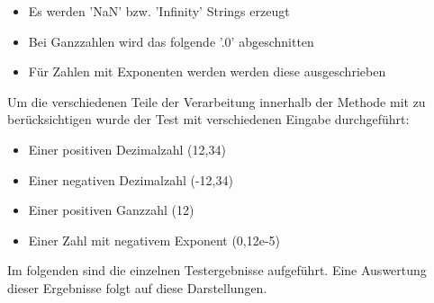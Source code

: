 \begin{itemize}
 	\item Es werden 'NaN' bzw. 'Infinity' Strings erzeugt
 	\item Bei Ganzzahlen wird das folgende '.0' abgeschnitten
 	\item Für Zahlen mit Exponenten werden werden diese ausgeschrieben
\end{itemize} 

Um die verschiedenen Teile der Verarbeitung innerhalb der Methode mit zu berücksichtigen 
wurde der Test mit verschiedenen Eingabe durchgeführt:

\begin{itemize}
	\item Einer positiven Dezimalzahl (12,34)
	\item Einer negativen Dezimalzahl (-12,34)
	\item Einer positiven Ganzzahl (12)
	\item Einer Zahl mit negativem Exponent (0,12e-5)
\end{itemize}

Im folgenden sind die einzelnen Testergebnisse aufgeführt. Eine Auswertung dieser
Ergebnisse folgt auf diese Darstellungen.


